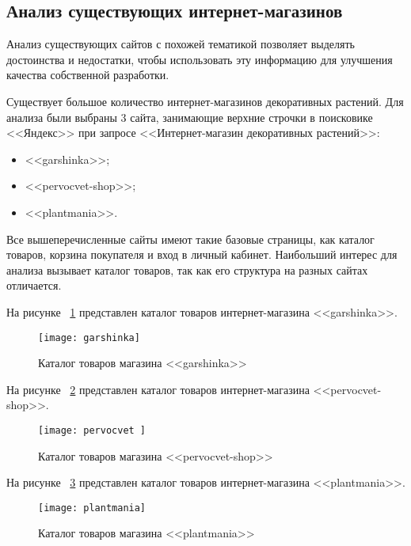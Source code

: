 \subsection{Анализ существующих интернет-магазинов}
\label{shopsAnalize}
Анализ существующих сайтов с похожей тематикой позволяет выделять достоинства и недостатки, чтобы использовать эту информацию для улучшения качества собственной разработки.

Существует большое количество интернет-магазинов декоративных растений. Для анализа были выбраны 3 сайта, занимающие верхние строчки в поисковике <<Яндекс>> при запросе <<Интернет-магазин декоративных растений>>:
\begin{itemize}
	\item <<garshinka>>;
	\item <<pervocvet-shop>>;
	\item <<plantmania>>.
\end{itemize}

Все вышеперечисленные сайты имеют такие базовые страницы, как каталог товаров, корзина покупателя и вход в личный кабинет. Наибольший интерес для анализа вызывает каталог товаров, так как  его структура на разных сайтах отличается.

На рисунке ~\ref{garshinka:image} представлен каталог товаров интернет-магазина <<garshinka>>.

\begin{figure}[h!]
	\texttt{[image: garshinka]}
	\caption{Каталог товаров магазина <<garshinka>>}
	\label{garshinka:image}
\end{figure}


На рисунке ~\ref{pervocvet:image} представлен каталог товаров интернет-магазина <<pervocvet-shop>>.

\begin{figure}[h!]
	\texttt{[image: pervocvet ]}
	\caption{Каталог товаров магазина <<pervocvet-shop>>}
	\label{pervocvet:image}
\end{figure}


На рисунке ~\ref{plantmania:image} представлен каталог товаров интернет-магазина <<plantmania>>.

\begin{figure}[h!]
	\texttt{[image: plantmania]}
	\caption{Каталог товаров магазина <<plantmania>>}
	\label{plantmania:image}
\end{figure}


